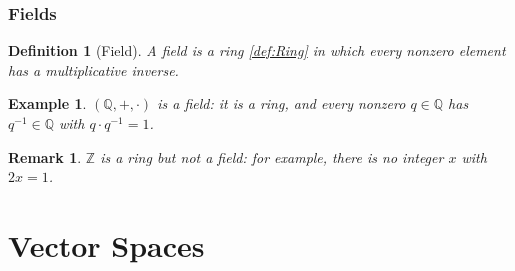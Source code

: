 \documentclass{article}
\newtheorem{definition}{Definition}
\newtheorem*{example}{Example}
\newtheorem{remark}{Remark}
\begin{document}
\subsubsection{Fields}
\begin{definition}[Field]
    A field is a ring \ref{def:Ring} in which every nonzero element has a multiplicative inverse.
\end{definition}
\begin{example}
    $(\mathbb{Q},+,\cdot)$ is a field: it is a ring, and every nonzero $q \in \mathbb{Q}$ has $q^{-1} \in \mathbb{Q}$ with $q\cdot q^{-1} = 1$.
\end{example}
\begin{remark}
    $\mathbb{Z}$ is a ring but not a field: for example, there is no integer $x$ with $2x=1$.
\end{remark}

\section{Vector Spaces}
\end{document}
